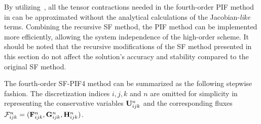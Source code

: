 By utilizing~,
all the tensor contractions needed in the fourth-order PIF method
in  can be approximated without
the analytical calculations of the Jacobian-\textit{like} terms.
Combining the recursive SF method, the PIF method can be implemented more efficiently,
allowing the system independence of the high-order scheme.
It should be noted that the recursive modifications of the SF method
presented in this section do not affect the solution's accuracy and stability
compared to the original SF method.

The fourth-order SF-PIF4 method can be summarized as the following stepwise fashion.
The discretization indices \( i,j,k \) and \( n \) are omitted for simplicity
in representing the conservative variables \( \mathbf{U}^{n}_{ijk} \)
and the corresponding fluxes \( \mathcal{F}^{n}_{ijk} = (\mathbf{F}^{n}_{ijk}, \mathbf{G}^{n}_{ijk}, \mathbf{H}^{n}_{ijk}) \).
